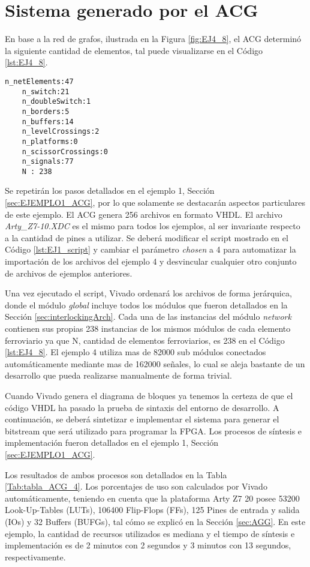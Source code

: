 \section{Sistema generado por el ACG}
	
	En base a la red de grafos, ilustrada en la Figura \ref{fig:EJ4_8}, el ACG determinó la siguiente cantidad de elementos, tal puede visualizarse en el Código \ref{lst:EJ4_8}.

	\begin{lstlisting}[language = {}, caption = Cantidad de elementos a implementar por el ACG, label = {lst:EJ4_8}]
	n_netElements:47
	n_switch:21
	n_doubleSwitch:1
	n_borders:5
	n_buffers:14
	n_levelCrossings:2
	n_platforms:0
	n_scissorCrossings:0
	n_signals:77
	N : 238
	\end{lstlisting}
	
	Se repetirán los pasos detallados en el ejemplo 1, Sección \ref{sec:EJEMPLO1_ACG}, por lo que solamente se destacarán aspectos particulares de este ejemplo. El ACG genera 256 archivos en formato VHDL. El archivo \textit{Arty\_Z7-10.XDC} es el mismo para todos los ejemplos, al ser invariante respecto a la cantidad de pines a utilizar. Se deberá modificar el script mostrado en el Código \ref{lst:EJ1_script} y cambiar el parámetro \textit{chosen} a 4 para automatizar la importación de los archivos del ejemplo 4 y desvincular cualquier otro conjunto de archivos de ejemplos anteriores.
	
	Una vez ejecutado el script, Vivado ordenará los archivos de forma jerárquica, donde el módulo \textit{global} incluye todos los módulos que fueron detallados en la Sección \ref{sec:interlockingArch}. Cada una de las instancias del módulo \textit{network} contienen sus propias 238 instancias de los mismos módulos de cada elemento ferroviario ya que N, cantidad de elementos ferroviarios, es 238 en el Código \ref{lst:EJ4_8}. El ejemplo 4 utiliza mas de 82000 sub módulos conectados automáticamente mediante mas de 162000 señales, lo cual se aleja bastante de un desarrollo que pueda realizarse manualmente de forma trivial.
	
	Cuando Vivado genera el diagrama de bloques ya tenemos la certeza de que el código VHDL ha pasado la prueba de sintaxis del entorno de desarrollo. A continuación, se deberá sintetizar e implementar el sistema para generar el bitstream que será utilizado para programar la FPGA. Los procesos de síntesis e implementación fueron detallados en el ejemplo 1, Sección \ref{sec:EJEMPLO1_ACG}.
	
	Los resultados de ambos procesos son detallados en la Tabla \ref{Tab:tabla_ACG_4}. Los porcentajes de uso son calculados por Vivado automáticamente, teniendo en cuenta que la plataforma Arty Z7 20 posee 53200 Look-Up-Tables (LUTs), 106400 Flip-Flops (FFs), 125 Pines de entrada y salida (IOs) y 32 Buffers (BUFGs), tal cómo se explicó en la Sección \ref{sec:AGG}. En este ejemplo, la cantidad de recursos utilizados es mediana y el tiempo de síntesis e implementación es de 2 minutos con 2 segundos y 3 minutos con 13 segundos, respectivamente.
	
